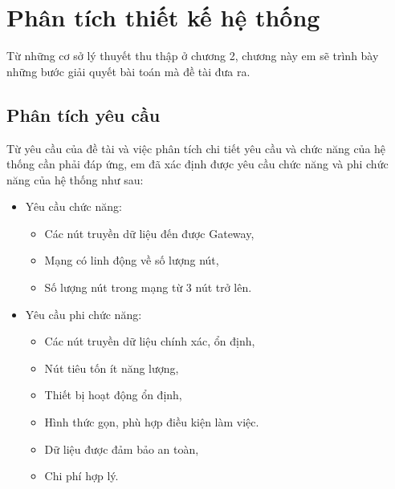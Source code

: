 \chapter{Phân tích thiết kế hệ thống}
\label{chapter3}
Từ những cơ sở lý thuyết thu thập ở chương 2, chương này em sẽ trình bày những bước giải quyết bài toán mà đề tài đưa ra.
\section{Phân tích yêu cầu}
Từ yêu cầu của đề tài và việc phân tích chi tiết yêu cầu và chức năng của hệ thống cần phải đáp ứng, em đã xác định được yêu cầu chức năng và phi chức năng của hệ thống như sau:
\begin{itemize}
\item	Yêu cầu chức năng:
	\begin{itemize}
	\item	Các nút truyền dữ liệu đến được Gateway,
	\item	Mạng có linh động về số lượng nút,
	\item	Số lượng nút trong mạng từ 3 nút trở lên.
	\end{itemize}
\item Yêu cầu phi chức năng:  
	\begin{itemize}
	\item 	Các nút truyền dữ liệu chính xác, ổn định,
	\item 	Nút tiêu tốn ít năng lượng,
	\item	Thiết bị hoạt động ổn định,
	\item	Hình thức gọn, phù hợp điều kiện làm việc.
	\item	Dữ liệu được đảm bảo an toàn,
	\item	Chi phí hợp lý.
	\end{itemize}
\end{itemize}
